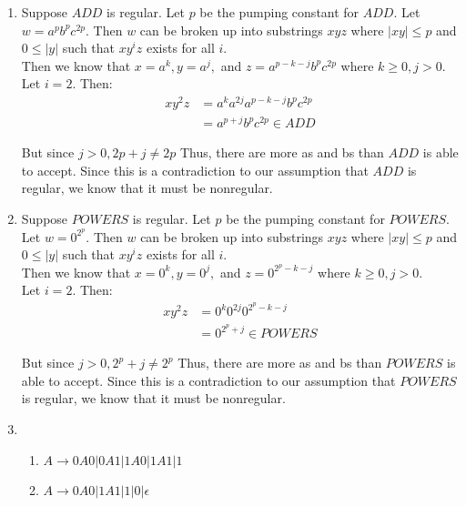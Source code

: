 


\begin{enumerate}
    \item Suppose $ADD$ is regular. Let $p$ be the pumping constant for $ADD$. Let $w = a^pb^pc^{2p}$. Then $w$ can be broken up into substrings $xyz$ where $|xy| \leq p$ and $0 \leq |y|$ such that $xy^iz$ exists for all $i$. \\

    Then we know that $x = a^k, y = a^j,$ and $z=a^{p-k-j}b^pc^{2p}$ where $k \geq 0, j > 0$. \\

    Let $i = 2$. Then:
    \begin{align*}
        xy^2z &= a^ka^{2j}a^{p-k-j}b^pc^{2p} \\
        &= a^{p+j}b^pc^{2p} \in ADD
    \end{align*}

    But since $j > 0, 2p+j \neq 2p$ Thus, there are more as and bs than $ADD$ is able to accept. Since this is a contradiction to our assumption that $ADD$ is regular, we know that it must be nonregular.

    \item Suppose $POWERS$ is regular. Let $p$ be the pumping constant for $POWERS$. Let $w = 0^{2^p}$. Then $w$ can be broken up into substrings $xyz$ where $|xy| \leq p$ and $0 \leq |y|$ such that $xy^iz$ exists for all $i$. \\

    Then we know that $x = 0^k, y = 0^j,$ and $z=0^{2^p - k - j}$ where $k \geq 0, j > 0$. \\

    Let $i = 2$. Then:
    \begin{align*}
        xy^2z &= 0^k0^{2j}0^{2^p - k - j} \\
        &= 0^{2^p + j} \in POWERS
    \end{align*}

    But since $j > 0, 2^p + j \neq 2^p$ Thus, there are more as and bs than $POWERS$ is able to accept. Since this is a contradiction to our assumption that $POWERS$ is regular, we know that it must be nonregular.

    \item \begin{enumerate}
        \item $A \to 0A0 | 0A1 | 1A0 | 1A1 | 1$

        \item $A \to 0A0 | 1A1 | 1 | 0 | \epsilon$


\end{enumerate}
\end{enumerate}
